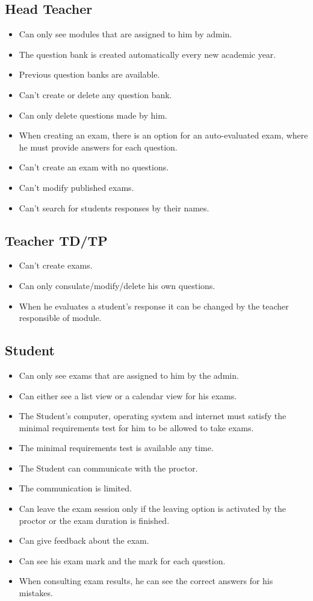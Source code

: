 \documentclass[]{uc2pfecaneva}
\begin{document}
\raggedright\subsection{Head Teacher}
\begin{itemize}
	\item Can only see modules that are assigned to him by admin.
	\item The question bank is created automatically every new academic year.
	\item Previous question banks are available.
	\item Can’t create or delete any question bank.
	\item Can only delete questions made by him.
	\item When creating an exam, there is an option for an auto-evaluated exam, where he must provide answers for each question.
	\item Can’t create an exam with no questions.
	\item Can’t modify published exams.
	\item Can’t search for students responses by their names.
\end{itemize}

\raggedright\subsection{Teacher TD/TP}
\begin{itemize}
	\item Can’t create exams.
	\item Can only consulate/modify/delete his own questions.
	\item When he evaluates a student’s response it can be changed by the teacher responsible of module.
\end{itemize}

\raggedright\subsection{Student}
\begin{itemize}
	\item Can only see exams that are assigned to him by the admin.
	\item Can either see a list view or a calendar view for his exams.
	\item The Student’s computer, operating system and internet  must satisfy the minimal requirements test for him to be allowed to take exams.
	\item The  minimal requirements test is available any time.
	\item The Student can communicate with the proctor.
	\item The communication is limited.
	\item Can leave the exam session only if the leaving option is activated by the proctor or the exam duration is finished.
	\item Can give feedback about the exam.
	\item Can see his exam mark and the mark for each question.
	\item When consulting exam results, he can see the correct answers for his mistakes.
\end{itemize}
\end{document}
